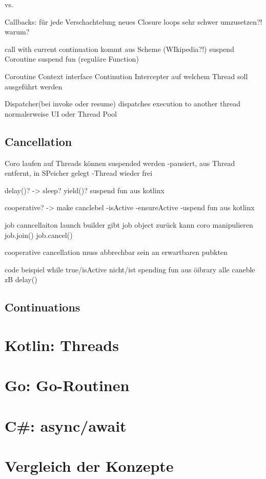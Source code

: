 \documentclass[fontsize=12pt,paper=a4,twoside=semi,parskip=half-,headsepline,headinclude]{scrreprt}
\begin{document}
vs.

Callbacks:
für jede Verschachtelung neues Closure
loops sehr schwer umzusetzen?! warum?

call with current continuation kommt aus Scheme (WIkipedia?!)
suspend Coroutine
suspend fun (reguläre Function)

Coroutine Context
interface Continution Intercepter
auf welchem Thread soll ausgeführt werden

Dispatcher(bei invoke oder resume)
dispatches execution to another thread
normalerweise UI oder Thread Pool

\subsection{Cancellation}

Coro laufen auf Threads
können suspended werden
-pausiert, aus Thread entfernt, in SPeicher gelegt
-Thread wieder frei

delay()? -> sleep?
yield()?
suspend fun aus kotlinx

cooperative? -> make canclebel
-isActive
-ensureActive
-uspend fun aus kotlinx

job canncellaiton
launch builder gibt job object zurück
kann coro manipulieren
job.join()
job.cancel()

cooperative cancellation
muss abbrechbar sein an erwartbaren pubkten

code beispiel 
while true/isActive nicht/ist
spending fun aus öibrary alle caneble zB delay()

\subsection{Continuations}


\section{Kotlin: Threads}

\section{Go: Go-Routinen}

\section{C\#: async/await}

\section{Vergleich der Konzepte}
\end{document}
